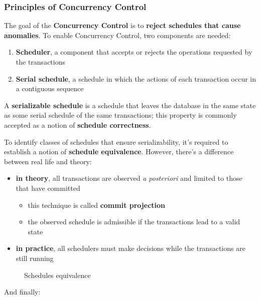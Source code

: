 \documentclass[english]{article}
\begin{document}
\subsubsection{Principles of Concurrency Control}

The goal of the \textbf{Concurrency Control} is to \textbf{reject schedules that cause anomalies}.
To enable Concurrency Control, two components are needed:

\begin{enumerate}
  \item \textbf{Scheduler}, a component that accepts or rejects the operations requested by the transactions
  \item \textbf{Serial schedule}, a schedule in which the actions of each transaction occur in a contiguous sequence
\end{enumerate}

\bigskip
A \textbf{serializable schedule} is a schedule that leaves the database in the same state as some serial schedule of the same transactions;
this property is commonly accepted as a notion of \textbf{schedule correctness}.

To identify classes of schedules that ensure serializability, it's required to establish a notion of \textbf{schedule equivalence}.
However, there's a difference between real life and theory:

\begin{itemize}
  \item \textbf{in theory}, all transactions are observed \textit{a posteriori} and limited to those that have committed
        \begin{itemize}
          \item this technique is called \textbf{commit projection}
          \item the observed schedule is admissible if the transactions lead to a valid state
        \end{itemize}
  \item \textbf{in practice}, all schedulers must make decisions while the transactions are still running
\end{itemize}

\begin{figure}[htbp]
  \bigskip
  \centering
  \caption{Schedules equivalence}
  \label{fig:schedules-equivalence}
  \bigskip
\end{figure}

And finally:
\end{document}
